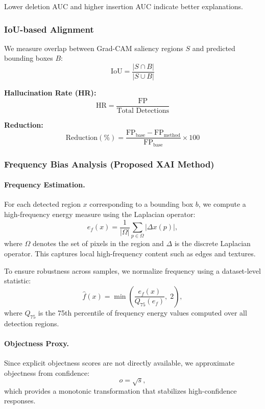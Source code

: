 Lower deletion AUC and higher insertion AUC indicate better explanations.

\subsubsection{IoU-based Alignment}

We measure overlap between Grad-CAM saliency regions $S$ and predicted bounding boxes $B$:
\[
\text{IoU} = \frac{|S \cap B|}{|S \cup B|}
\]

\textbf{Hallucination Rate (HR):}
\[
\text{HR} = \frac{\text{FP}}{\text{Total Detections}}
\]

\textbf{Reduction:}
\[
\text{Reduction}(\%) = \frac{\text{FP}_{\text{base}} - \text{FP}_{\text{method}}}{\text{FP}_{\text{base}}} \times 100
\]

\subsubsection{Frequency Bias Analysis (Proposed XAI Method)}

\paragraph{Frequency Estimation.}
For each detected region $x$ corresponding to a bounding box $b$, we compute a high-frequency energy measure using the Laplacian operator:
\begin{equation}
    e_f(x) = \frac{1}{|\Omega|} \sum_{p \in \Omega} |\Delta x(p)|,
\end{equation}
where $\Omega$ denotes the set of pixels in the region and $\Delta$ is the discrete Laplacian operator. This captures local high-frequency content such as edges and textures.

To ensure robustness across samples, we normalize frequency using a dataset-level statistic:
\begin{equation}
    \hat{f}(x) = \min\!\left(\frac{e_f(x)}{Q_{75}(e_f)},\; 2\right),
\end{equation}
where $Q_{75}$ is the 75th percentile of frequency energy values computed over all detection regions.

\paragraph{Objectness Proxy.}
Since explicit objectness scores are not directly available, we approximate objectness from confidence:
\begin{equation}
    o = \sqrt{s},
\end{equation}
which provides a monotonic transformation that stabilizes high-confidence responses.

